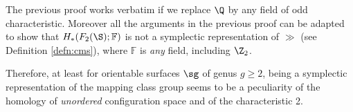 The previous proof works verbatim if we replace $\Q$ by any field of odd characteristic. Moreover
all the arguments in the previous proof can be adapted to show that $H_*(F_2(\S);\mathbb{F})$ is
not a symplectic representation of $\gg$ (see Definition \ref{defn:cms}), where
$\mathbb{F}$ is \emph{any} field, including $\Z_2$.

Therefore, at least for orientable surfaces $\sg$ of genus $g\geq 2$,
being a symplectic representation of the mapping class group seems to be a peculiarity
of the homology of \emph{unordered} configuration space and of the characteristic 2.